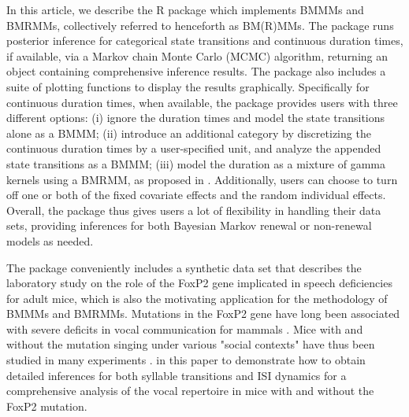 In this article, we describe the R package  which implements BMMMs and BMRMMs, collectively referred to henceforth as BM(R)MMs. 
The  package runs posterior inference for categorical state transitions and continuous duration times, if available, 
via a Markov chain Monte Carlo (MCMC) algorithm, returning an object containing comprehensive inference results. 
The package also includes a suite of plotting functions to display the results graphically. 
Specifically for continuous duration times, when available, the package provides users with three different options: (i)
ignore the duration times and model the state transitions alone as a BMMM; 
(ii) introduce an additional category by discretizing the continuous duration times by a user-specified unit, 
and analyze the appended state transitions as a BMMM; 
(iii) model the duration as a mixture of gamma kernels using a BMRMM, as proposed in \citet{wu2021bayesian}. 
Additionally,  users can choose to turn off one or both of the fixed covariate effects and the random individual effects. 
Overall, the  package thus gives users a lot of flexibility in handling their data sets, 
providing inferences for both Bayesian Markov renewal or non-renewal models as needed.
 




The  package conveniently includes a synthetic  data set that describes the laboratory study on the role of the FoxP2 gene implicated in speech deficiencies for adult mice,  which is also the motivating application for the methodology of BMMMs and BMRMMs.  
Mutations in the FoxP2 gene have long been associated with  severe deficits in vocal communication for mammals  \citep{macdermot2005identification}. 
Mice with and without the mutation singing under various "social contexts" have thus been studied in many experiments \citep{Fujita_etal:2008,Castellucci_etal:2016,Gaub_etal:2016,Chabout_etal:2016}. 
 in this paper to demonstrate how to obtain detailed inferences for both syllable transitions and ISI dynamics for a comprehensive analysis of the vocal repertoire in mice with and without the FoxP2 mutation.


